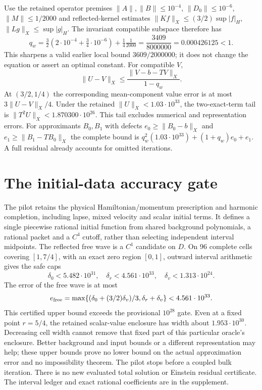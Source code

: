 \documentclass[11pt]{article}
\begin{document}
Use the retained operator premises
$\|A\|,\|B\|\le10^{-4}$, $\|D_0\|\le10^{-6}$,
$\|M\|\le1/2000$ and reflected-kernel estimates
$\|Kf\|_X\le(3/2)\sup|f|_H$, $\|Lg\|_X\le\sup|g|_H$.
The invariant compatible subspace therefore has
\[
 q_w=\tfrac32(2\cdot10^{-4}+\tfrac34\cdot10^{-6})
       +\tfrac14\tfrac1{2000}=\frac{3409}{8000000}=0.000426125<1.
\]
This sharpens a valid earlier local bound $3609/2000000$; it does not
change the equation or assert an optimal constant. For compatible $V$,
\[
 \|U-V\|_X\le\frac{\|V-b-TV\|_X}{1-q_w}.
\]
At $(3/2,1/4)$ the corresponding mean-component value error is at most
$3\|U-V\|_X/4$. Under the retained $\|U\|_X<1.03\cdot10^{33}$,
the two-exact-term tail is $\|T^2U\|_X<1.870300\cdot10^{26}$.
This tail excludes numerical and representation errors. For approximants
$B_0,B_1$ with defects $e_0\ge\|B_0-b\|_X$ and
$e_1\ge\|B_1-TB_0\|_X$ the complete bound is
$q_w^2(1.03\cdot10^{33})+(1+q_w)e_0+e_1$.
A full residual already accounts for omitted iterations.

\section*{The initial-data accuracy gate}
The pilot retains the physical Hamiltonian/momentum prescription and
harmonic completion, including lapse, mixed velocity and scalar initial
terms. It defines a single piecewise rational initial function from shared
background polynomials, a rational packet and a $C^4$ cutoff, rather than
selecting independent interval midpoints. The reflected free wave is a
$C^1$ candidate on $D$. On 96 complete cells covering $[1,7/4]$, with an
exact zero region $[0,1]$, outward interval arithmetic gives the safe caps
\[
 \delta_0<5.482\cdot10^{31},\quad
 \delta_r<4.561\cdot10^{33},\quad
 \delta_v<1.313\cdot10^{24}.
\]
The error of the free wave is at most
\[
 e_{\rm free}=\max\{(\delta_0+(3/2)\delta_v)/3,\delta_r+\delta_v\}
 <4.561\cdot10^{33}.
\]
This certified upper bound exceeds the provisional $10^{28}$ gate.
Even at a fixed point $r=5/4$, the retained scalar-value enclosure has
width about $1.953\cdot10^{30}$. Decreasing cell width cannot remove
that fixed part of this particular oracle's enclosure. Better background
and input bounds or a different representation may help; these upper
bounds prove no lower bound on the actual approximation error and no
impossibility theorem. The pilot stops before a coupled bulk iteration.
There is no new evaluated total solution or Einstein residual certificate.
The interval ledger and exact rational coefficients are in the supplement.
\end{document}
